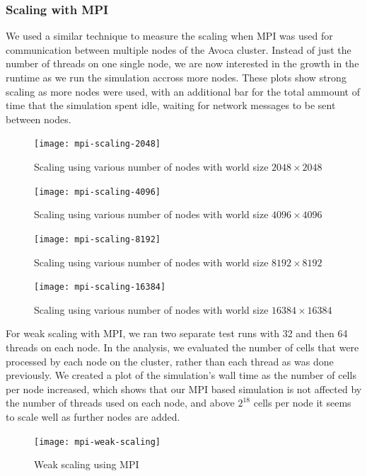 \documentclass[a4paper]{article}
\begin{document}
\subsubsection{Scaling with MPI}

We used a similar technique to measure the scaling when MPI was used for communication between multiple nodes of the Avoca cluster. Instead of just the number of threads on one single node, we are now interested in the growth in the runtime as we run the simulation accross more nodes. These plots show strong scaling as more nodes were used, with an additional bar for the total ammount of time that the simulation spent idle, waiting for network messages to be sent between nodes.

\begin{figure}
    \centering
    \texttt{[image: mpi-scaling-2048]}
    \caption{Scaling using various number of nodes with world size $2048 \times 2048$}
\end{figure}

\begin{figure}
    \centering
    \texttt{[image: mpi-scaling-4096]}
    \caption{Scaling using various number of nodes with world size $4096 \times 4096$}
\end{figure}

\begin{figure}
    \centering
    \texttt{[image: mpi-scaling-8192]}
    \caption{Scaling using various number of nodes with world size $8192 \times 8192$}
\end{figure}

\begin{figure}
    \centering
    \texttt{[image: mpi-scaling-16384]}
    \caption{Scaling using various number of nodes with world size $16384 \times 16384$}
\end{figure}

For weak scaling with MPI, we ran two separate test runs with 32 and then 64 threads on each node.
In the analysis, we evaluated the number of cells that were processed by each node on the cluster, rather than each thread as was done previously.
We created a plot of the simulation's wall time as the number of cells per node increased, which shows that our MPI based simulation is not affected by the number of threads used on each node, and above $2^{18}$ cells per node it seems to scale well as further nodes are added.

\begin{figure}
    \centering
    \texttt{[image: mpi-weak-scaling]}
    \caption{Weak scaling using MPI}
\end{figure}
\end{document}
